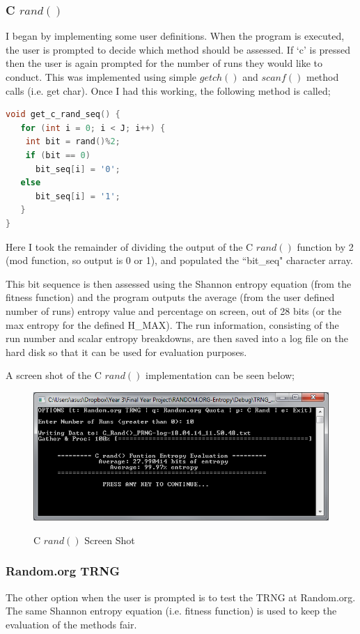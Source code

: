 \documentclass[a4paper,10.5pt]{article}
\begin{document}
\subsubsection{C $rand()$}
I began by implementing some user definitions. When the program is executed, the user is prompted to decide which method should be assessed. If `c' is pressed then the user is again prompted for the number of runs they would like to conduct. This was implemented using simple $getch()$ and $scanf()$ method calls (i.e. get char). Once I had this working, the following method is called;

\begin{lstlisting}[language=C]
void get_c_rand_seq() {
   for (int i = 0; i < J; i++) {
    int bit = rand()%2;
    if (bit == 0)
      bit_seq[i] = '0';
   else 
      bit_seq[i] = '1';
   }
}
\end{lstlisting}

Here I took the remainder of dividing the output of the C $rand()$ function by 2 (mod function, so output is 0 or 1), and populated the ``bit\_seq" character array.

This bit sequence is then assessed using the Shannon entropy equation (from the fitness function) and the program outputs the average (from the user defined number of runs) entropy value and percentage on screen, out of 28 bits (or the max entropy for the defined H\_MAX). The run information, consisting of the run number and scalar entropy breakdowns, are then saved into a log file on the hard disk so that it can be used for evaluation purposes.

A screen shot of the C $rand()$ implementation can be seen below;

\begin{figure}[H]
\centering
\caption{C $rand()$ Screen Shot}
\includegraphics[scale = 0.75]{c-ss.png}
\label{sngpss}
\end{figure}


\subsubsection{Random.org TRNG}
The other option when the user is prompted is to test the TRNG at Random.org. The same Shannon entropy equation (i.e. fitness function) is used to keep the evaluation of the methods fair. 
\end{document}
